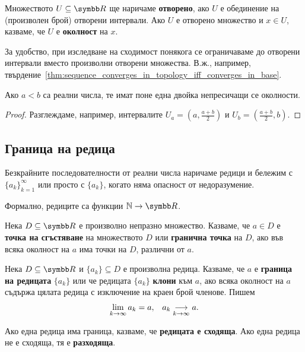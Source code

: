 \documentclass[numbers=endperiod, bibliography=totocnumbered]{scrartcl}
\begin{document}
\begin{definition}
  Множеството \( U \subseteq \R \) ще наричаме \textbf{отворено}, ако \( U \) е обединение на (произволен брой) отворени интервали. Ако \( U \) е отворено множество и \( x \in U \), казваме, че \( U \) е \textbf{околност} на \( x \).
\end{definition}

За удобство, при изследване на сходимост понякога се ограничаваме до отворени интервали вместо произволни отворени множества. В.ж., например, твърдение~\ref{thm:sequence_converges_in_topology_iff_converges_in_base}.

\begin{lemma}\label{thm:real_numbers_are_hausdorff}
  Ако \( a < b \) са реални числа, те имат поне една двойка непресичащи се околности.
\end{lemma}
\begin{proof}
  Разглеждаме, например, интервалите \( U_a = \left(a, \tfrac {a + b} 2 \right) \) и \( U_b = \left(\tfrac {a + b} 2, b\right) \).
\end{proof}

\subsection{Граница на редица}

\begin{definition}
  Безкрайните последователности от реални числа наричаме редици и бележим с \( {\{ a_k \}}_{k=1}^\infty \) или просто с \( \{ a_k \} \), когато няма опасност от недоразумение.

  Формално, редиците са функции \( \mathbb{N} \to \R \).
\end{definition}

\begin{definition}
  Нека \( D \subseteq \R \) е произволно непразно множество. Казваме, че \( a \in D \) е \textbf{точка на сгъстяване} на множеството \( D \) или \textbf{гранична точка} на \( D \), ако във всяка околност на \( a \) има точки на \( D \), различни от \( a \).
\end{definition}

\begin{definition}
  Нека \( D \subseteq \R \) и \( \{ a_k \} \subseteq D \) е произволна редица. Казваме, че \( a \) е \textbf{граница на редицата} \( \{ a_k \} \) или че редицата \( \{ a_k \} \) \textbf{клони} към \( a \), ако всяка околност на \( a \) съдържа цялата редица с изключение на краен брой членове. Пишем
  \begin{align*}
    \lim_{k \to \infty} a_k = a,
    &&
    a_k \Conv[k \to \infty]{} a.
  \end{align*}

  Ако една редица има граница, казваме, че \textbf{редицата е сходяща}. Ако една редица не е сходяща, тя е \textbf{разходяща}.
\end{definition}
\end{document}
